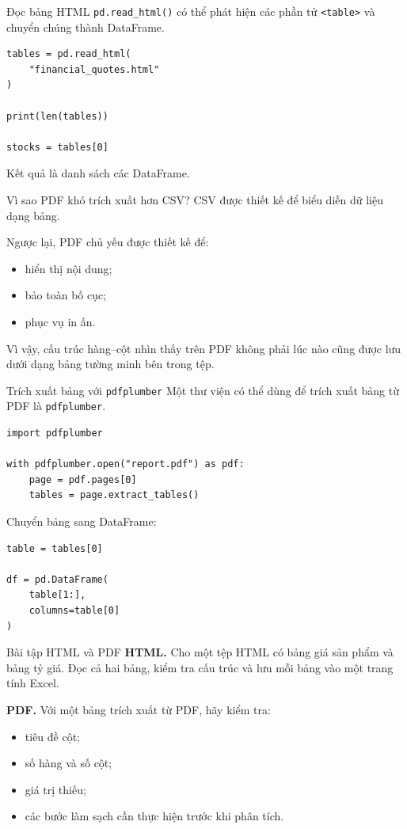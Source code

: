 \documentclass[aspectratio=169,11pt]{beamer}
\newcommand{\code}[1]{\texttt{#1}}
\newcommand{\smallgap}{\vspace{0.4em}}
\begin{document}
\begin{frame}[fragile]{Đọc bảng HTML}
\code{pd.read\_html()} có thể phát hiện các phần tử \code{<table>} và chuyển chúng thành DataFrame.

\begin{lstlisting}[style=pythonstyle]
tables = pd.read_html(
    "financial_quotes.html"
)

print(len(tables))

stocks = tables[0]
\end{lstlisting}

Kết quả là danh sách các DataFrame.
\end{frame}

\begin{frame}{Vì sao PDF khó trích xuất hơn CSV?}
CSV được thiết kế để biểu diễn dữ liệu dạng bảng.

\smallgap
Ngược lại, PDF chủ yếu được thiết kế để:
\begin{itemize}
  \item hiển thị nội dung;
  \item bảo toàn bố cục;
  \item phục vụ in ấn.
\end{itemize}

Vì vậy, cấu trúc hàng--cột nhìn thấy trên PDF không phải lúc nào cũng được lưu dưới dạng bảng tường minh bên trong tệp.
\end{frame}

\begin{frame}[fragile]{Trích xuất bảng với \code{pdfplumber}}
Một thư viện có thể dùng để trích xuất bảng từ PDF là \code{pdfplumber}.

\begin{lstlisting}[style=pythonstyle]
import pdfplumber

with pdfplumber.open("report.pdf") as pdf:
    page = pdf.pages[0]
    tables = page.extract_tables()
\end{lstlisting}

Chuyển bảng sang DataFrame:
\begin{lstlisting}[style=pythonstyle]
table = tables[0]

df = pd.DataFrame(
    table[1:],
    columns=table[0]
)
\end{lstlisting}
\end{frame}

\begin{frame}{Bài tập HTML và PDF}
\textbf{HTML.} Cho một tệp HTML có bảng giá sản phẩm và bảng tỷ giá. Đọc cả hai bảng, kiểm tra cấu trúc và lưu mỗi bảng vào một trang tính Excel.

\smallgap
\textbf{PDF.} Với một bảng trích xuất từ PDF, hãy kiểm tra:
\begin{itemize}
  \item tiêu đề cột;
  \item số hàng và số cột;
  \item giá trị thiếu;
  \item các bước làm sạch cần thực hiện trước khi phân tích.
\end{itemize}
\end{frame}
\end{document}
